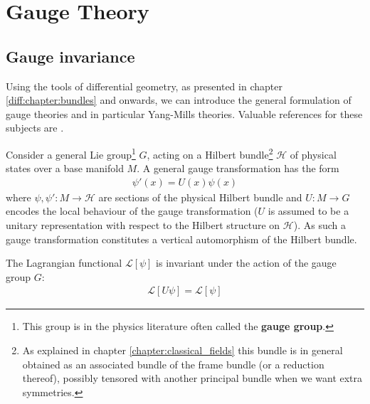 \chapter{Gauge Theory}

\section{Gauge invariance}

	Using the tools of differential geometry, as presented in chapter \ref{diff:chapter:bundles} and onwards, we can introduce the general formulation of gauge theories and in particular Yang-Mills theories. Valuable references for these subjects are \cite{principal_bundles,sen_nash,schuller,gauge1}.

	Consider a general Lie group\footnote{This group is in the physics literature often called the \textbf{gauge group}.} $G$, acting on a Hilbert bundle\footnote{As explained in chapter \ref{chapter:classical_fields} this bundle is in general obtained as an associated bundle of the frame bundle (or a reduction thereof), possibly tensored with another principal bundle when we want extra symmetries.} $\mathcal{H}$ of physical states over a base manifold $M$. A general gauge transformation has the form
	\begin{gather}
		\label{qft:gauge_transformation}
		\psi'(x) = U(x)\psi(x)
	\end{gather}
	where $\psi, \psi':M\rightarrow\mathcal{H}$ are sections of the physical Hilbert bundle and $U:M\rightarrow G$ encodes the local behaviour of the gauge transformation ($U$ is assumed to be a unitary representation with respect to the Hilbert structure on $\mathcal{H}$). As such a gauge transformation constitutes a vertical automorphism of the Hilbert bundle.
	
	\begin{axiom}
		The Lagrangian functional $\mathcal{L}[\psi]$ is invariant under the action of the gauge group $G$:
		\begin{gather}
			\mathcal{L}[U\psi] = \mathcal{L}[\psi]
		\end{gather}
	\end{axiom}

